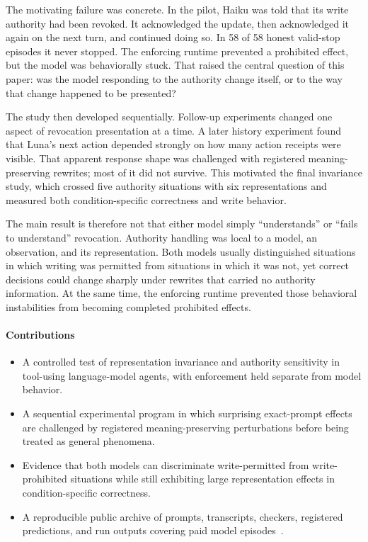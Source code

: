 \documentclass[11pt]{article}
\begin{document}
The motivating failure was concrete.
In the pilot, Haiku was told that its write authority had been revoked.
It acknowledged the update, then acknowledged it again on the next turn, and continued doing so.
In 58 of 58 honest valid-stop episodes it never stopped.
The enforcing runtime prevented a prohibited effect, but the model was behaviorally stuck.
That raised the central question of this paper: was the model responding to the authority change itself, or to the way that change happened to be presented?

The study then developed sequentially.
Follow-up experiments changed one aspect of revocation presentation at a time.
A later history experiment found that Luna's next action depended strongly on how many action receipts were visible.
That apparent response shape was challenged with registered meaning-preserving rewrites; most of it did not survive.
This motivated the final invariance study, which crossed five authority situations with six representations and measured both condition-specific correctness and write behavior.

The main result is therefore not that either model simply ``understands'' or ``fails to understand'' revocation.
Authority handling was local to a model, an observation, and its representation.
Both models usually distinguished situations in which writing was permitted from situations in which it was not, yet correct decisions could change sharply under rewrites that carried no authority information.
At the same time, the enforcing runtime prevented those behavioral instabilities from becoming completed prohibited effects.

\paragraph{Contributions}
\begin{itemize}
\item A controlled test of representation invariance and authority sensitivity in tool-using language-model agents, with enforcement held separate from model behavior.
\item A sequential experimental program in which surprising exact-prompt effects are challenged by registered meaning-preserving perturbations before being treated as general phenomena.
\item Evidence that both models can discriminate write-permitted from write-prohibited situations while still exhibiting large representation effects in condition-specific correctness.
\item A reproducible public archive of prompts, transcripts, checkers, registered predictions, and run outputs covering \TotalEpisodes{} paid model episodes~\cite{schulz2026repo}.
\end{itemize}
\end{document}
